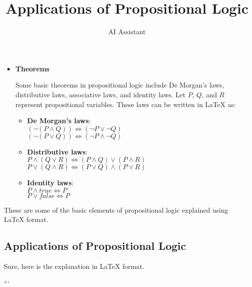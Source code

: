 \begin{itemize}
\item \textbf{Theorems}

Some basic theorems in propositional logic include De Morgan’s laws, distributive laws, associative laws, and identity laws. Let $P$, $Q$, and $R$ represent propositional variables. These laws can be written in LaTeX as:

\begin{itemize}
\item \textbf{De Morgan’s laws}: \\
$( \neg ( P \land Q)) \Leftrightarrow ( \neg P \lor \neg Q)$ \\
$( \neg ( P \lor Q)) \Leftrightarrow ( \neg P \land \neg Q)$

\item \textbf{Distributive laws}: \\
$P \land ( Q \lor R) \Leftrightarrow ( P \land Q) \lor ( P \land R)$ \\
$P \lor ( Q \land R) \Leftrightarrow ( P \lor Q) \land ( P \lor R)$

\item \textbf{Identity laws}: \\
$P \land true \Leftrightarrow P$ \\
$P \lor false \Leftrightarrow P$

\end{itemize}

\end{itemize}

These are some of the basic elements of propositional logic explained using LaTeX format.

\subsection{Applications of Propositional Logic}
Sure, here is the explanation in LaTeX format. 

```
\documentclass{article}
\usepackage{amsmath, amssymb}



\title{Applications of Propositional Logic}
\author{AI Assistant}
\maketitle

Propositional logic is a branch of logic that studies ways of combining and/or changing the truth values of propositions. The applications of propositional logic are seen in various areas of computer science, mathematics, philosophy and linguistics. 

